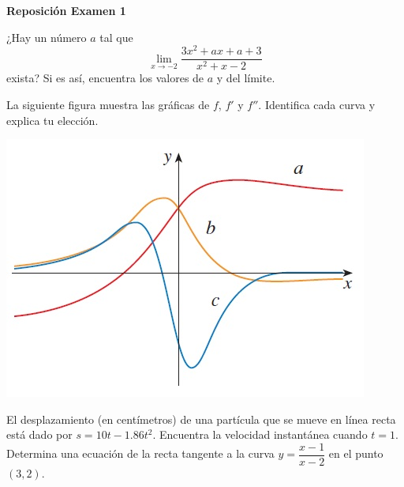 \documentclass[12pt]{exam}
\begin{document}
\begin{center}
\Large 
\textbf{Reposición Examen 1}
\end{center}{}
\normalsize



\pointformat{\bfseries\boldmath(\thepoints)}
\vskip10pt

\begin{questions}

\question 
¿Hay un número $a$ tal que $$\lim\limits_{x \to -2}\dfrac{3x^2+ax+a+3}{x^2+x-2}$$ exista? Si es así, encuentra los valores de $a$ y del límite. 
\vskip10pt



   \question La siguiente figura muestra las gráficas de $f$, $f'$ y $f''$. Identifica cada curva y explica tu elección. 
   \begin{center}
  \includegraphics[scale=1]{curvas derivada.jpg}     
   \end{center}

\question El desplazamiento (en centímetros) de una partícula que se mueve en línea recta está dado por $s=10t-1.86t^2$. Encuentra la velocidad instantánea cuando $t=1$.
 \vskip10pt
\question 
Determina una ecuación de la recta tangente a la curva $y=\dfrac{x-1}{x-2}$ en el punto $(3,2)$.

\end{questions}
\end{document}
